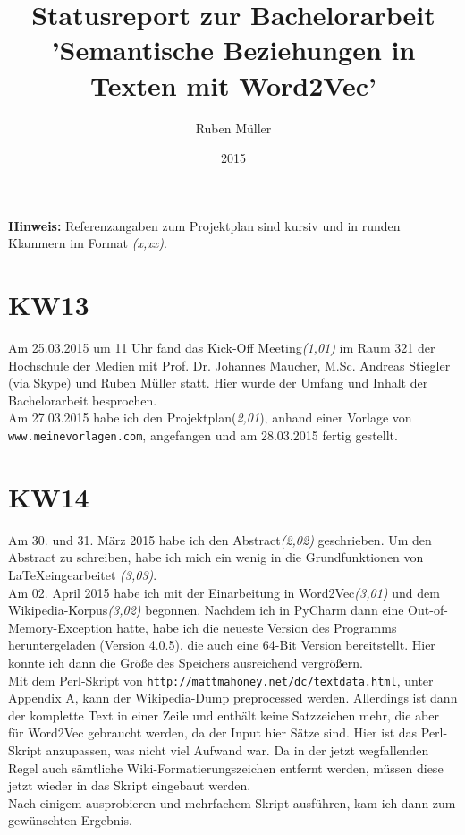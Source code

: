 \documentclass[11pt,a4paper]{article}
\begin{document}
\title{Statusreport zur Bachelorarbeit 'Semantische Beziehungen in Texten mit Word2Vec'}
\date{2015}
\author{Ruben Müller}
\maketitle

\textbf{Hinweis:} Referenzangaben zum Projektplan sind kursiv und in runden Klammern im Format \textit{(x,xx)}.
\section*{KW13}
Am 25.03.2015 um 11 Uhr fand das Kick-Off Meeting\textit{(1,01)} im Raum 321 der Hochschule der Medien  mit Prof. Dr. Johannes Maucher, M.Sc. Andreas Stiegler (via Skype) und Ruben Müller statt. Hier wurde der Umfang und Inhalt der Bachelorarbeit besprochen.
\\Am 27.03.2015 habe ich den Projektplan(\textit{2,01}), anhand einer Vorlage von \\\texttt{www.meinevorlagen.com}, angefangen und am 28.03.2015 fertig gestellt. 
\section*{KW14}
Am 30. und 31. März 2015 habe ich den Abstract\textit{(2,02)} geschrieben. Um den Abstract zu schreiben, habe ich mich ein wenig in die Grundfunktionen von \LaTeX eingearbeitet \textit{(3,03)}.
\\Am 02. April 2015 habe ich mit der Einarbeitung in Word2Vec\textit{(3,01)} und dem Wikipedia-Korpus\textit{(3,02)} begonnen. Nachdem ich in PyCharm dann eine Out-of-Memory-Exception hatte, habe ich die neueste Version des Programms heruntergeladen (Version 4.0.5), die auch eine 64-Bit Version bereitstellt. Hier konnte ich dann die Größe des Speichers ausreichend vergrößern. 
\\Mit dem Perl-Skript von \texttt{http://mattmahoney.net/dc/textdata.html}, unter Appendix A, kann der Wikipedia-Dump preprocessed werden. Allerdings ist dann der komplette Text in einer Zeile und enthält keine Satzzeichen mehr, die aber für Word2Vec gebraucht werden, da der Input hier Sätze sind. Hier ist das Perl-Skript anzupassen, was nicht viel Aufwand war. Da in der jetzt wegfallenden Regel auch sämtliche Wiki-Formatierungszeichen entfernt werden, müssen diese jetzt wieder in das Skript eingebaut werden.
\\Nach einigem ausprobieren und mehrfachem Skript ausführen, kam ich dann zum gewünschten Ergebnis.
\end{document}
